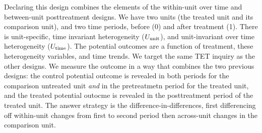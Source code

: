 \documentclass[
]{article}
\begin{document}
Declaring this design combines the elements of the within-unit over time
and between-unit posttreatment designs. We have two units (the treated
unit and its comparison unit), and two time periods, before (0) and
after treatment (1). There is unit-specific, time invariant
heterogeneity (\(U_{\rm unit}\)), and unit-invariant over time
heterogeneity (\(U_{\rm time}\)). The potential outcomes are a function
of treatment, these heterogeneity variables, and time trends. We target
the same TET inquiry as the other designs. We measure the outcome in a
way that combines the two previous designs: the control potential
outcome is revealed in both periods for the comparison untreated unit
\emph{and} in the pretreatmetn period for the treated unit, and the
treated potential outocme is revealed in the posttreatment period of the
treated unit. The answer strategy is the difference-in-differences,
first differencing off within-unit changes from first to second period
then across-unit changes in the comparison unit.
\end{document}
